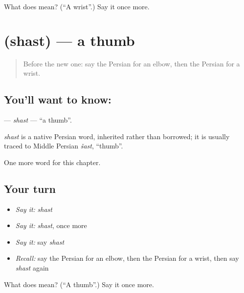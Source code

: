 \begin{tcolorbox}[breakable,colback=teal!4,colframe=teal!35!black,title={Before you move on}]
What does  mean? (\textquotedblleft{}A wrist\textquotedblright{}.) Say it once more.
\end{tcolorbox}
\section[\texorpdfstring{\fa{شست} (shast)}{شست (shast)}]{ (shast) — a thumb}

\label{lesson:FA-C108-shast}



\begin{quote}
Before the new one: say the Persian for an elbow, then the Persian for a wrist.
\end{quote}

\subsection*{You'll want to know: }
\textbf{} — \emph{shast} — \textquotedblleft{}a thumb\textquotedblright{}.

\begin{cousinweb}
\emph{shast} is a native Persian word, inherited rather than borrowed; it is usually traced to Middle Persian \emph{šast}, \textquotedblleft{}thumb\textquotedblright{}.
\end{cousinweb}

\begin{grammarlens}[title={What you've built}]
One more word for this chapter.
\end{grammarlens}

\subsection*{Your turn}
\begin{itemize}
\raggedright
  \item \emph{Say it:} \emph{shast}
  \item \emph{Say it:} \emph{shast}, once more
  \item \emph{Say it:} say \emph{shast}
  \item \emph{Recall:} say the Persian for an elbow, then the Persian for a wrist, then say \emph{shast} again
\end{itemize}

\begin{tcolorbox}[breakable,colback=teal!4,colframe=teal!35!black,title={Before you move on}]
What does  mean? (\textquotedblleft{}A thumb\textquotedblright{}.) Say it once more.
\end{tcolorbox}
